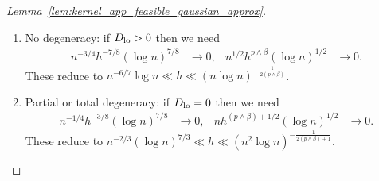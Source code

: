 \documentclass[11pt,lof]{puthesis}
\newcommand{\Dl}{\ensuremath{D_{\textup{lo}}}}
\theoremstyle{break}
\theoremstyle{proof}
\newtheorem{proof}{Proof}
\begin{document}
\begin{proof}[Lemma~\ref{lem:kernel_app_feasible_gaussian_approx}]
\begin{enumerate}[label=(\roman*)]
\item No degeneracy:
if $\Dl > 0$ then we need
%
\begin{align*}
n^{-3/4} h^{-7/8} (\log n)^{7/8}
&\to 0,
&n^{1/2} h^{p \wedge \beta} (\log n)^{1/2}
&\to 0.
\end{align*}
%
These reduce to
$n^{-6/7} \log n \ll h
\ll (n \log n)^{-\frac{1}{2(p \wedge \beta)}}$.

\item Partial or total degeneracy:
if $\Dl = 0$ then we need
%
\begin{align*}
n^{-1/4} h^{-3/8} (\log n)^{7/8}
&\to 0,
&n h^{(p \wedge \beta) + 1/2} (\log n)^{1/2}
&\to 0.
\end{align*}
%
These reduce to
$n^{-2/3} (\log n)^{7/3} \ll h
\ll (n^2 \log n)^{-\frac{1}{2(p \wedge \beta) + 1}}$.
%
\end{enumerate}

\end{proof}
\end{document}
